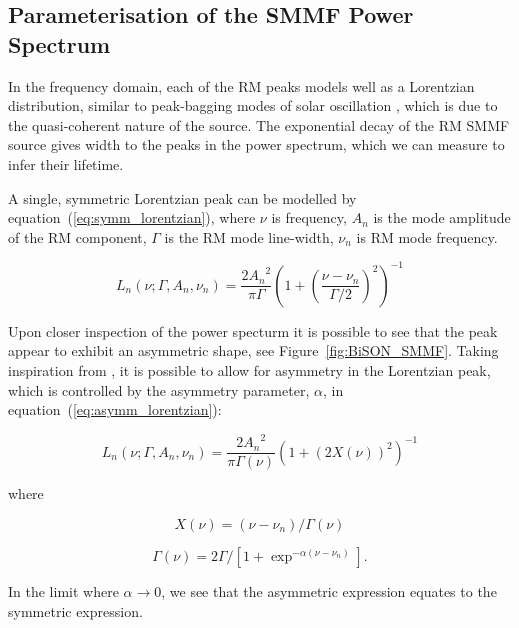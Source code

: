 \subsection{Parameterisation of the SMMF Power Spectrum}

In the frequency domain, each of the RM peaks models well as a Lorentzian distribution, similar to peak-bagging modes of solar oscillation \citep{handberg_bayesian_2011, davies_low-frequency_2014}, which is due to the quasi-coherent nature of the source. The exponential decay of the RM SMMF source gives width to the peaks in the power spectrum, which we can measure to infer their lifetime.

A single, symmetric Lorentzian peak can be modelled by equation~(\ref{eq:symm_lorentzian}), where $\nu$ is frequency, $A_n$ is the mode amplitude of the RM component, $\Gamma$ is the RM mode line-width, $\nu_n$ is RM mode frequency.

\begin{equation}
L_n(\nu; \Gamma, A_n, \nu_n) = \frac{2{A_n}^2}{\pi \Gamma} \left(1 + \left(\frac{\nu - \nu_{n}}{\Gamma /2}\right)^2\right)^{-1} 
\label{eq:symm_lorentzian}
\end{equation}

Upon closer inspection of the power specturm it is possible to see that the peak appear to exhibit an asymmetric shape, see Figure~\ref{fig:BiSON_SMMF}. Taking inspiration from \citep{howe_solar_2020}, it is possible to allow for asymmetry in the Lorentzian peak, which is controlled by the asymmetry parameter, $\alpha$, in equation~(\ref{eq:asymm_lorentzian}):

\begin{equation}
L_n(\nu; \Gamma, A_n, \nu_n) = \frac{2{A_n}^2}{\pi \Gamma(\nu)} \left(1 + \left(2X(\nu)\right)^2\right)^{-1} 
\label{eq:asymm_lorentzian}
\end{equation}

where

\begin{equation}
X(\nu) = (\nu - \nu_n)/\Gamma(\nu)
\label{eq:asymm_freq}
\end{equation}

\begin{equation}
\Gamma(\nu) = 2\Gamma / [1 + \exp^{-\alpha(\nu - \nu_n)}] .
\label{eq:asymm_width}
\end{equation}

In the limit where $\alpha \rightarrow 0$, we see that the asymmetric expression equates to the symmetric expression.


